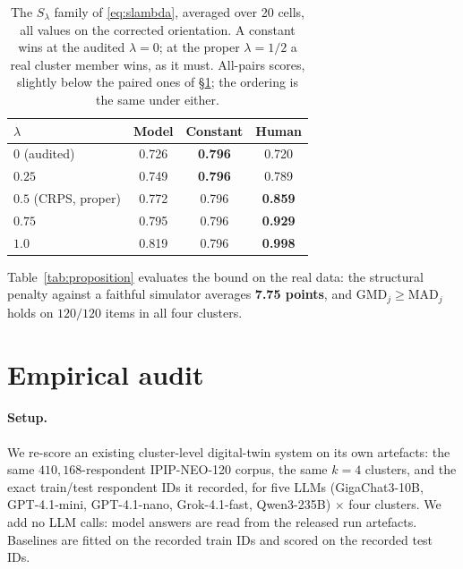 \documentclass[11pt]{article}
\begin{document}
\begin{table}[t]\centering\footnotesize
\setlength{\tabcolsep}{4pt}
\begin{tabular}{lccc}
\toprule
$\lambda$ & Model & Constant & Human\\
\midrule
$0$ \;(audited) & 0.726 & \textbf{0.796} & 0.720\\
$0.25$ & 0.749 & \textbf{0.796} & 0.789\\
$0.5$ \;(CRPS, proper) & 0.772 & 0.796 & \textbf{0.859}\\
$0.75$ & 0.795 & 0.796 & \textbf{0.929}\\
$1.0$ & 0.819 & 0.796 & \textbf{0.998}\\
\bottomrule
\end{tabular}
\caption{The $S_\lambda$ family of \eqref{eq:slambda}, averaged over 20 cells, all
values on the corrected orientation. A constant wins at the audited
$\lambda{=}0$; at the proper $\lambda{=}1/2$ a real cluster member wins, as it
must. All-pairs scores, slightly below the paired ones of \S\ref{sec:audit};
the ordering is the same under either.}
\label{tab:lambda}
\end{table}

Table~\ref{tab:proposition} evaluates the bound on the real data: the structural
penalty against a faithful simulator averages \textbf{7.75 points}, and
$\mathrm{GMD}_j \ge \mathrm{MAD}_j$ holds on $120/120$ items in all four clusters.

\begin{table}[t]\centering\footnotesize

\caption{Proposition~\ref{prop:main} on $410{,}168$ IPIP-NEO-120 respondents.
$S$(const) is the best constant predictor; $S$(faithful) is a simulator that
reproduces the cluster response distribution exactly. The faithful simulator is
worse in every cluster.}
\label{tab:proposition}
\end{table}

\section{Empirical audit}
\label{sec:audit}

\paragraph{Setup.} We re-score an existing cluster-level digital-twin system on
its own artefacts: the same $410{,}168$-respondent IPIP-NEO-120 corpus, the same
$k{=}4$ clusters, and the exact train/test respondent IDs it recorded, for five
LLMs (GigaChat3-10B, GPT-4.1-mini, GPT-4.1-nano, Grok-4.1-fast, Qwen3-235B)
$\times$ four clusters. We add no LLM calls: model answers are read from the
released run artefacts. Baselines are fitted on the recorded train IDs and scored
on the recorded test IDs.
\end{document}

